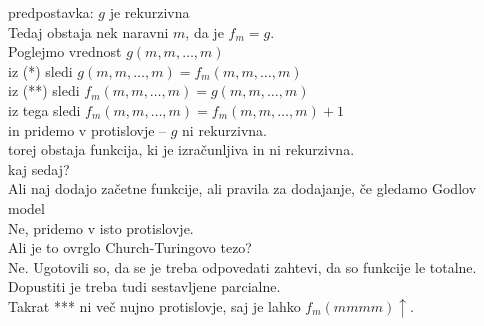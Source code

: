 \documentclass[10pt,a4paper,oneside]{book}
\begin{document}
\begin{neurejeno}
{predpostavka: $g$ je rekurzivna\\
	Tedaj obstaja nek naravni $m$, da je $f_m = g$.\\%
	Poglejmo vrednost $g(m,m,\dots,m)$\\
	iz (*) sledi $g(m, m, \dots, m) = f_m(m, m, \dots, m)$\\
	iz (**) sledi $f_m(m, m, \dots, m) = g(m, m, \dots, m)$\\
	iz tega sledi $f_m(m, m, \dots, m) = f_m(m, m, \dots, m)+1$\\ %
	in pridemo v protislovje -- $g$ ni rekurzivna.\\%
	torej obstaja funkcija, ki je izračunljiva in ni rekurzivna.\\%
	
	kaj sedaj?\\
	Ali naj dodajo začetne funkcije, ali pravila za dodajanje, če gledamo Godlov model\\%
	Ne, pridemo v isto protislovje.\\

	Ali je to ovrglo Church-Turingovo tezo?\\
	Ne. Ugotovili so, da se je treba odpovedati zahtevi, da so funkcije le totalne. Dopustiti je treba tudi sestavljene parcialne.\\
	Takrat *** ni več nujno protislovje, saj je lahko $f_m(mmmm)\uparrow$.
}
\end{neurejeno}

\end{document}
